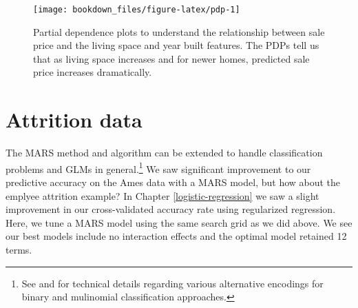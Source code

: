 \documentclass[]{krantz}
\begin{document}
\begin{figure}

{\centering \texttt{[image: bookdown\_files/figure-latex/pdp-1]} 

}

\caption{Partial dependence plots to understand the relationship between sale price and the living space and year built features.  The PDPs tell us that as living space increases and for newer homes, predicted sale price increases dramatically.}\label{fig:pdp}
\end{figure}

\hypertarget{attrition-data-1}{%
\section{Attrition data}\label{attrition-data-1}}

The MARS method and algorithm can be extended to handle classification problems and GLMs in general.\footnote{See \citet{esl} and \citet{stone1997polynomial} for technical details regarding various alternative encodings for binary and mulinomial classification approaches.} We saw significant improvement to our predictive accuracy on the Ames data with a MARS model, but how about the emplyee attrition example? In Chapter \ref{logistic-regression} we saw a slight improvement in our cross-validated accuracy rate using regularized regression. Here, we tune a MARS model using the same search grid as we did above. We see our best models include no interaction effects and the optimal model retained 12 terms.
\end{document}
